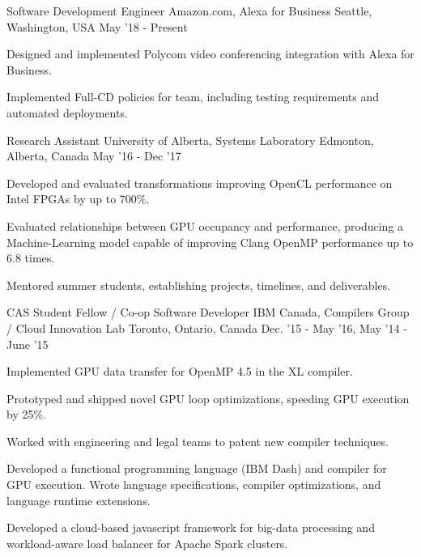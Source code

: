 \begin{cventries}
\cventry
    {Software Development Engineer} %
    {Amazon.com, Alexa for Business} %
    {Seattle, Washington, USA} %
    {May '18 - Present} %
    {
        \begin{cvitems}
            \item Designed and implemented Polycom video conferencing integration with Alexa for Business.
            \item Implemented Full-CD policies for team, including testing requirements and automated deployments.
        \end{cvitems}
    }
\vspace{2mm}
\cventry
    {Research Assistant} %
    {University of Alberta, Systems Laboratory} %
    {Edmonton, Alberta, Canada} %
    {May '16 - Dec '17} %
    {
        \begin{cvitems}
            \item Developed and evaluated transformations improving OpenCL performance on Intel FPGAs by up to 700\%.
            \item Evaluated relationships between GPU occupancy and performance, producing a Machine-Learning model capable of improving Clang OpenMP performance up to 6.8 times.
            \item Mentored summer students, establishing projects, timelines, and deliverables.
        \end{cvitems}
    }
\vspace{2mm}
\cventry
    {CAS Student Fellow / Co-op Software Developer} %
    {IBM Canada, Compilers Group / Cloud Innovation Lab} %
    {Toronto, Ontario, Canada} %
    {Dec. '15 - May '16, May '14 - June '15} %
    {
        \begin{cvitems}
            \item Implemented GPU data transfer for OpenMP 4.5 in the XL compiler.
            \item Prototyped and shipped novel GPU loop optimizations, speeding GPU execution by 25\%.
            \item Worked with engineering and legal teams to patent new compiler techniques.
            \item Developed a functional programming language (IBM Dash) and compiler for GPU execution. Wrote language specifications, compiler optimizations, and language runtime extensions.
            \item Developed a cloud-based javascript framework for big-data processing and workload-aware load balancer for Apache Spark clusters.

\end{cvitems}}
\end{cventries}
